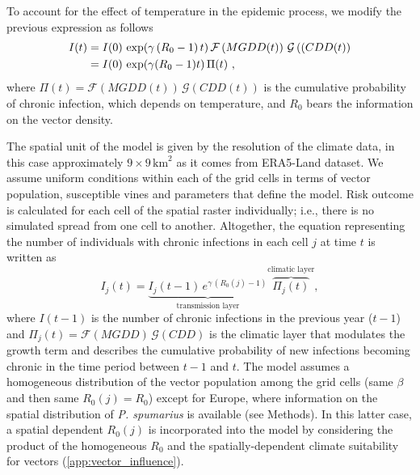 To account for the effect of temperature in the epidemic process, we modify
the previous expression as follows
\begin{align}
    \label{eq:final_eq}
    I(t) & =I(0)\, \exp(\gamma\, (R_0-1)\, t)\,
    \mathcal{F}\left(MGDD(t)\right)\,
    \mathcal{G}\left((CDD(t)\right) \nonumber
    \\
         & =I(0)\, \exp(\gamma(R_0-1)t)\, \Pi(t) \ ,
\end{align}
where $\Pi(t)=\mathcal{F}(MGDD(t))\, \mathcal{G}(CDD(t))$ is the cumulative
probability of chronic infection, which depends on temperature, and $R_0$ bears
the information on the vector density.

The spatial unit of the model is given by the resolution of the climate data,
in this case approximately $9 \times 9\,  \textrm{km}^2$ as it comes from
ERA5-Land dataset. We assume uniform conditions within each of the grid cells
in terms of vector population, susceptible vines and parameters that define the
model. Risk outcome is calculated for each cell of the spatial raster
individually; i.e., there is no simulated spread from one cell to another.
Altogether, the equation representing the number of individuals with chronic
infections in each cell $j$ at time $t$ is written as
\begin{equation}\label{eq:evolution_eq}
    I_j(t)=\underbrace{I_j(t-1) \, e^{\gamma \,
                (R_0(j)-1)}}_\text{transmission
        layer}	  \overbrace{\Pi_j(t)}^\text{climatic layer} ,
\end{equation}
where $I(t-1)$ is the number of chronic infections in the previous year
($t-1$) and $\Pi_j(t)=\mathcal{F}(MGDD)\, \mathcal{G}(CDD)$ is the climatic
layer that modulates the growth term and describes the cumulative probability
of new infections becoming chronic in the time period between $t-1$ and $t$.
The model assumes a homogeneous distribution of the vector population among
the grid cells (same $\beta$ and then same $R_0(j) = R_0$) except for Europe,
where information on the spatial distribution of \textit{P. spumarius} is
available (see Methods). In this latter case, a spatial dependent $R_0(j)$ is
incorporated into the model by considering the product of the homogeneous
$R_0$ and the spatially-dependent climate suitability for vectors
(\cref{app:vector_influence}).

